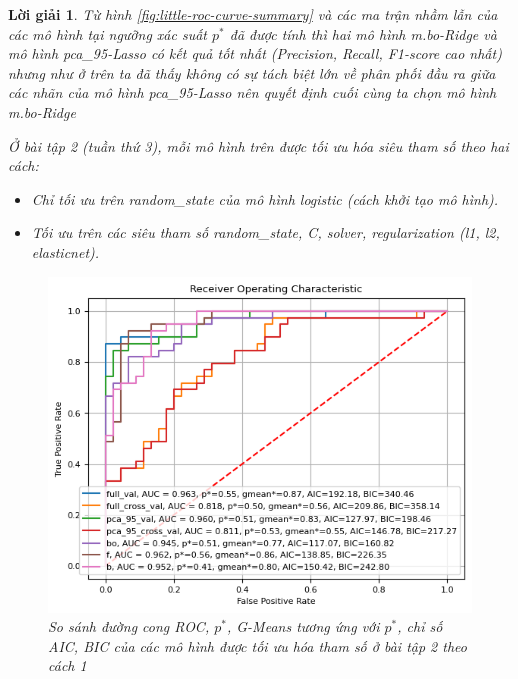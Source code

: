 \documentclass[14pt, a4paper]{article}
\theoremstyle{sltheorem}
\theoremstyle{soltheorem}
\newtheorem*{loigiai}{Lời giải}
\begin{document}
\begin{loigiai}
    Từ hình \ref{fig:little-roc-curve-summary} và các ma trận nhầm lẫn của các mô hình tại ngưỡng xác suất $p^*$ đã được tính thì hai mô hình m.bo-Ridge và mô hình pca\_95-Lasso có kết quả tốt nhất (Precision, Recall, F1-score cao nhất) nhưng như ở trên ta đã thấy không có sự tách biệt lớn về phân phối đầu ra giữa các nhãn của mô hình pca\_95-Lasso nên quyết định cuối cùng ta chọn mô hình m.bo-Ridge

    Ở bài tập 2 (tuần thứ 3), mỗi mô hình trên được tối ưu hóa siêu tham số theo hai cách:

    \begin{itemize}
        \item Chỉ tối ưu trên random\_state của mô hình logistic (cách khởi tạo mô hình).
        \item Tối ưu trên các siêu tham số random\_state, C, solver, regularization (l1, l2, elasticnet).
    \end{itemize}

    \begin{figure}[h!]
        \centering
        \includegraphics[width=1.0\textwidth]{figures/ROC_Curve_AIC_BIC_Excercise_2_1.png}
        \caption{ So sánh đường cong ROC, $p^*$, G-Means tương ứng với $p^*$, chỉ số AIC, BIC của các mô hình được tối ưu hóa tham số ở bài tập 2 theo cách 1}
        \label{fig:ROC-Curve-AIC-BIC_Excercise-2-1}
    \end{figure}


\end{loigiai}
\end{document}
